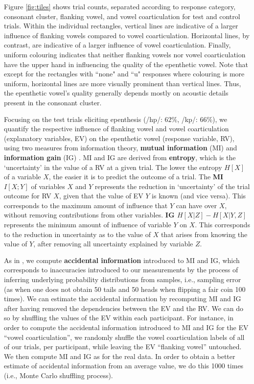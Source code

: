 Figure \ref{fig:tiles} shows trial counts, separated according to response category, consonant cluster, flanking vowel, and vowel coarticulation for test and control trials. Within the individual rectangles, vertical lines are indicative of a larger influence of flanking vowels compared to vowel coarticulation. Horizontal lines, by contrast, are indicative of a larger influence of vowel coarticulation. Finally, uniform colouring indicates that neither flanking vowels nor vowel coarticulation have the upper hand in influencing the quality of the epenthetic vowel. Note that except for the rectangles with ``none" and ``u" responses where colouring is more uniform, horizontal lines are more visually prominent than vertical lines. Thus, the epenthetic vowel's quality generally depends mostly on acoustic details present in the consonant cluster. 

Focusing on the test trials eliciting epenthesis (/hp/: $62\%$, /kp/: $66\%$), we quantify the respective influence of flanking vowel and vowel coarticulation (explanatory variables, EV) on the epenthetic vowel (response variable, RV), using two measures from information theory, \textbf{mutual information} (MI) and \textbf{information gain} (IG) \cite[see][for a comprehensive description of these measures]{daland2015}. MI and IG are derived from \textbf{entropy}, which is the `uncertainty' in the value of a RV at a given trial. The lower the entropy $H[X]$ of a variable $X$, the easier it is to predict the outcome of a trial. The \textbf{MI $I[X;Y]$} of variables $X$ and $Y$ represents the reduction in `uncertainty' of the trial outcome for RV $X$, given that the value of EV $Y$ is known (and vice versa). This corresponds to the maximum amount of influence that $Y$ can have over $X$, without removing contributions from other variables. \textbf{IG $H[X|Z] - H[X|Y,Z]$} represents the minimum amount of influence of variable $Y$ on $X$. This corresponds to the reduction in uncertainty as to the value of $X$ that arises from knowing the value of $Y$, after removing all uncertainty explained by variable $Z$. 

As in \cite{daland2015}, we compute \textbf{accidental information} introduced to MI and IG, which corresponds to inaccuracies introduced to our measurements by the process of inferring underlying probability distributions from samples, i.e., sampling error (as when one does not obtain 50 tails and 50 heads when flipping a fair coin 100 times).
We can estimate the accidental information by recomputing MI and IG after having removed the dependencies between the EV and the RV. We can do so by shuffling the values of the EV within each participant. For instance, in order to compute the accidental information introduced to MI and IG for the EV ``vowel coarticulation'', we randomly shuffle the vowel coarticulation labels of all of our trials, per participant, while leaving the EV ``flanking vowel'' untouched. We then compute MI and IG as for the real data. In order to obtain a better estimate of accidental information from an average value, we do this 1000 times (i.e., Monte Carlo shuffling process). 

